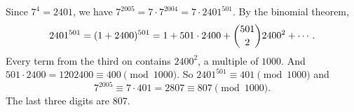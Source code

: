 Since $7^4=2401$, we have $7^{2005}=7\cdot7^{2004}=7\cdot2401^{501}$. By the binomial theorem,
\[2401^{501}=(1+2400)^{501}=1+501\cdot2400+\dbinom{501}{2}2400^2+\cdots.\]
Every term from the third on contains $2400^2$, a multiple of $1000$. And $501\cdot2400=1202400\equiv400\pmod{1000}$. So $2401^{501}\equiv401\pmod{1000}$ and
\[7^{2005}\equiv7\cdot401=2807\equiv807\pmod{1000}.\]
The last three digits are $\boxed{807}$.

